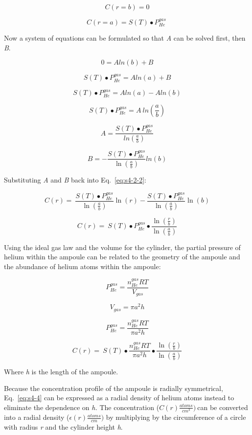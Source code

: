 \[C(r = b) = 0\]

\[C(r = a) = S(T) \bullet P_{He}^{gas}\ \]

Now a system of equations can be formulated so that \emph{A} can be
solved first, then \emph{B}.

\[0 = Aln(b) + B\]

\[S(T) \bullet P_{He}^{gas} = Aln(a) + B\]

\[S(T) \bullet P_{He}^{gas} = Aln(a) - Aln(b)\]

\[S(T) \bullet P_{He}^{gas} = A\ ln\left( \frac{a}{b} \right)\]

\[A = \frac{S(T) \bullet P_{He}^{gas}}{ln\left( \frac{a}{b} \right)}\]

\[B = - \frac{S(T) \bullet P_{He}^{gas}}{\ln\left( \frac{a}{b} \right)}ln(b)\]

Substituting \emph{A} and \emph{B} back into Eq.~\eqref{eq:s4-2-2}:

\[C(r) = \ \frac{S(T) \bullet P_{He}^{gas}}{\ln\left( \frac{a}{b} \right)}\ln(r) - \frac{S(T) \bullet P_{He}^{gas}}{\ln\left( \frac{a}{b} \right)}\ln(b)\]

\begin{equation}
C(r) = \ S(T) \bullet P_{He}^{gas} \bullet \frac{\ln\left( \frac{r}{b} \right)}{\ln\left( \frac{a}{b} \right)}
\label{eq:s4-3}
\end{equation}

Using the ideal gas law and the volume for the cylinder, the partial
pressure of helium within the ampoule can be related to the geometry of
the ampoule and the abundance of helium atoms within the ampoule:

\[P_{He}^{gas} = \frac{n_{He}^{gas}RT}{V_{gas}}\]

\[V_{gas} = \pi a^{2}h\]

\[P_{He}^{gas} = \frac{n_{He}^{gas}RT}{\pi a^{2}h}\]

\begin{equation}
C(r) = \ S(T) \bullet \frac{n_{He}^{gas}RT}{\pi a^{2}h} \bullet \frac{\ln\left( \frac{r}{b} \right)}{\ln\left( \frac{a}{b} \right)}
\label{eq:s4-4}
\end{equation}

Where \emph{h} is the length of the ampoule.

Because the concentration profile of the ampoule is radially
symmetrical, Eq.~\eqref{eq:s4-4} can be expressed as a radial density of helium
atoms instead to eliminate the dependence on \emph{h.} The concentration
(\(C(r)\frac{atoms}{cm^{3}})\ \)can be converted into a radial density
(\(\epsilon(r)\frac{atoms}{cm})\) by multiplying by the circumference of
a circle with radius \emph{r} and the cylinder height \emph{h}.

